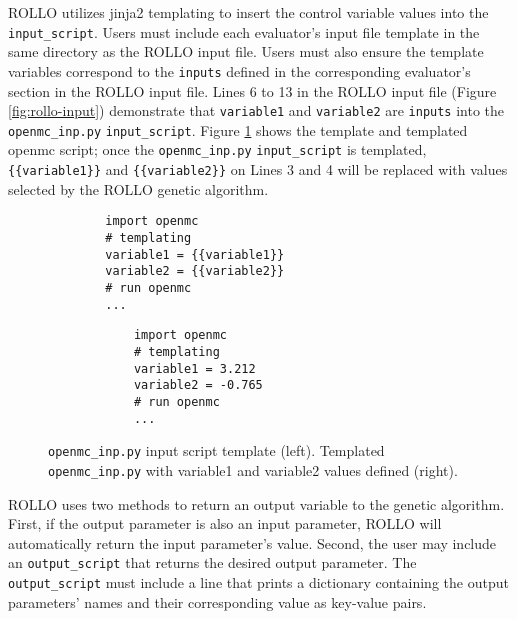 \gls{ROLLO} utilizes jinja2 templating \cite{ronacher_welcome_2018} to insert 
the control variable values into the \texttt{input\_script}.
Users must include each evaluator's input file template in the same directory as the \gls{ROLLO} input 
file. 
Users must also ensure the template variables correspond to the \texttt{inputs} defined in the 
corresponding evaluator's section in the ROLLO input file. 
Lines 6 to 13 in the \gls{ROLLO} input file (Figure \ref{fig:rollo-input}) demonstrate 
that \texttt{variable1} and \texttt{variable2} are \texttt{inputs} into the 
\texttt{openmc\_inp.py} \texttt{input\_script}. 
Figure \ref{fig:openmcinp.py} shows the template and templated openmc script; 
once the \texttt{openmc\_inp.py} \texttt{input\_script} is templated, 
\texttt{\{\{variable1\}\}} and \texttt{\{\{variable2\}\}}  on Lines 3 and 4 will be 
replaced with values selected by the \gls{ROLLO} genetic algorithm. 
\begin{figure}[]
    \begin{minipage}{0.4\textwidth}
        \centering
    \begin{verbatim}
        import openmc 
        # templating 
        variable1 = {{variable1}}
        variable2 = {{variable2}}
        # run openmc 
        ... 
    \end{verbatim}
    \end{minipage}
    \hspace{2cm}
    \begin{minipage}{0.4\textwidth}
        \centering
        \begin{verbatim}
            import openmc 
            # templating 
            variable1 = 3.212
            variable2 = -0.765
            # run openmc 
            ... 
        \end{verbatim}
        \end{minipage}
    \caption{\texttt{openmc\_inp.py} input script template (left). 
             Templated \texttt{openmc\_inp.py} with variable1 and variable2 
             values defined (right).}
    \label{fig:openmcinp.py}
\end{figure}

\gls{ROLLO} uses two methods to return an output variable to the genetic algorithm. 
First, if the output parameter is also an input parameter, \gls{ROLLO} will automatically 
return the input parameter's value. 
Second, the user may include an \texttt{output\_script} that returns the desired 
output parameter. 
The \texttt{output\_script} must include a line that prints a dictionary containing 
the output parameters' names and their corresponding value as key-value pairs. 

